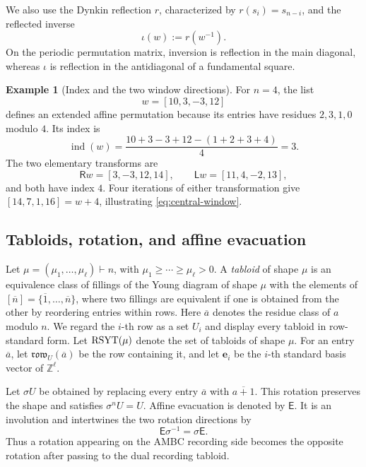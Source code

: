 \documentclass[11pt]{article}
\theoremstyle{definition}
\newtheorem{example}[theorem]{Example}
\theoremstyle{remark}
\newcommand{\Z}{\mathbb Z}
\newcommand{\ol}[1]{\overline{#1}}
\newcommand{\row}{\mathfrak{row}}
\newcommand{\RSYT}{\textup{RSYT}}
\newcommand{\ind}{\operatorname{ind}}
\newcommand{\e}{\mathbf e}
\newcommand{\Rop}{\mathsf R}
\newcommand{\Lop}{\mathsf L}
\newcommand{\E}{\mathsf E}
\begin{document}
We also use the Dynkin reflection \(r\), characterized by
\(r(s_i)=s_{n-i}\), and the reflected inverse
\begin{equation}\label{eq:iota}
                         \iota(w):=r(w^{-1}).
\end{equation}
On the periodic permutation matrix, inversion is reflection in the main diagonal,
whereas \(\iota\) is reflection in the antidiagonal of a fundamental square.

\begin{example}[Index and the two window directions]\label{ex:prelim-window}
For \(n=4\), the list
\[
                         w=[10,3,-3,12]
\]
defines an extended affine permutation because its entries have residues
\(2,3,1,0\) modulo \(4\).  Its index is
\[
               \ind(w)=\frac{10+3-3+12-(1+2+3+4)}4=3.
\]
The two elementary transforms are
\[
 \Rop w=[3,-3,12,14],
 \qquad
 \Lop w=[11,4,-2,13],
\]
and both have index \(4\).  Four iterations of either transformation give
\([14,7,1,16]=w+4\), illustrating \eqref{eq:central-window}.
\end{example}

\subsection{Tabloids, rotation, and affine evacuation}

Let \(\mu=(\mu_1,\ldots,\mu_\ell)\vdash n\), with
\(\mu_1\ge\cdots\ge\mu_\ell>0\).  A \emph{tabloid} of shape \(\mu\) is an
equivalence class of fillings of the Young diagram of shape \(\mu\) with the elements
of \([\ol n]=\{\ol1,\ldots,\ol n\}\), where two fillings are equivalent if one is
obtained from the other by reordering entries within rows.  Here \(\ol a\) denotes the
residue class of \(a\) modulo \(n\).  We regard the \(i\)-th row as a set \(U_i\) and
display every tabloid in row-standard form.  Let \(\RSYT(\mu)\) denote the set of
tabloids of shape \(\mu\).  For an entry \(\ol a\), let \(\row_U(\ol a)\) be the row
containing it, and let \(\e_i\) be the \(i\)-th standard basis vector of \(\Z^\ell\).

Let \(\sigma U\) be obtained by replacing every entry \(\ol a\) with \(\ol{a+1}\).
This rotation preserves the shape and satisfies
\(\sigma^nU=U\).  Affine evacuation is denoted by \(\E\).  It is an involution and
intertwines the two rotation directions by \cite{CFKLY22}
\begin{equation}\label{eq:evac-rotation}
                         \E\sigma^{-1}=\sigma\E.
\end{equation}
Thus a rotation appearing on the AMBC recording side becomes the opposite rotation
after passing to the dual recording tabloid.
\end{document}
